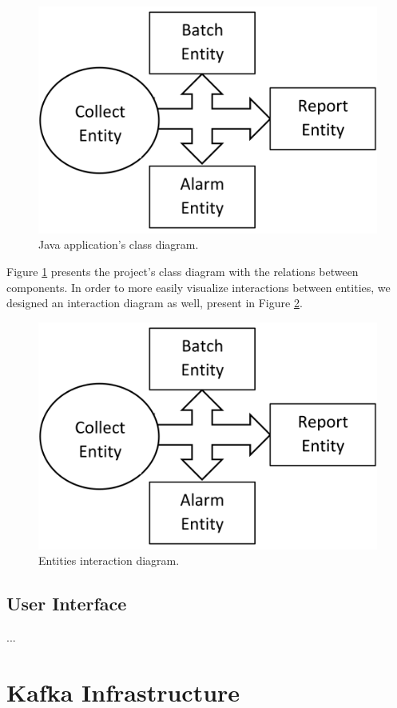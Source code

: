 \documentclass[12pt]{article}
\begin{document}
\begin{figure}[H]
  \centering
  \begin{minipage}{\textwidth}
    \centering
    \includegraphics[width=.5\linewidth]{img/BlockDiagram.png}
  \end{minipage}%
  \caption{Java application's class diagram.}
  \label{ClassDiagram}
\end{figure} 

Figure \ref{ClassDiagram} presents the project's class diagram with the relations between components.
In order to more easily visualize interactions between entities, we designed an interaction diagram as well, present in Figure \ref{InteractionDiagram}.

\begin{figure}[H]
  \centering
  \begin{minipage}{\textwidth}
    \centering
    \includegraphics[width=.5\linewidth]{img/BlockDiagram.png}
  \end{minipage}%
  \caption{Entities interaction diagram.}
  \label{InteractionDiagram}
\end{figure} 

\subsection{User Interface} %

...

\newpage
\section{Kafka Infrastructure} \label{infrastructure} %
\end{document}
